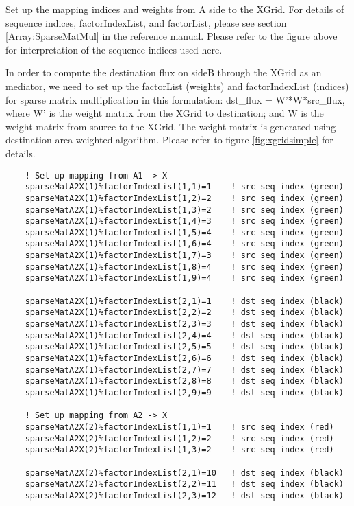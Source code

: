   
   Set up the mapping indices and weights from A side to the XGrid. For details of
   sequence indices, factorIndexList, and factorList, please see section
   \ref{Array:SparseMatMul} in the reference manual. Please refer to the figure above
   for interpretation of the sequence indices used here.
  
   In order to compute the destination flux on sideB through the XGrid as an mediator,
   we need to set up the factorList (weights) and factorIndexList (indices)
   for sparse matrix multiplication in this formulation:
   dst\_flux = W'*W*src\_flux, where W' is the weight matrix from the XGrid to
   destination; and W is the weight matrix from source to the XGrid. The weight matrix
   is generated using destination area weighted algorithm. Please refer to figure
   \ref {fig:xgridsimple} for details.
   

 \begin{verbatim}
    ! Set up mapping from A1 -> X
    sparseMatA2X(1)%factorIndexList(1,1)=1    ! src seq index (green)
    sparseMatA2X(1)%factorIndexList(1,2)=2    ! src seq index (green)
    sparseMatA2X(1)%factorIndexList(1,3)=2    ! src seq index (green)
    sparseMatA2X(1)%factorIndexList(1,4)=3    ! src seq index (green)
    sparseMatA2X(1)%factorIndexList(1,5)=4    ! src seq index (green)
    sparseMatA2X(1)%factorIndexList(1,6)=4    ! src seq index (green)
    sparseMatA2X(1)%factorIndexList(1,7)=3    ! src seq index (green)
    sparseMatA2X(1)%factorIndexList(1,8)=4    ! src seq index (green)
    sparseMatA2X(1)%factorIndexList(1,9)=4    ! src seq index (green)

    sparseMatA2X(1)%factorIndexList(2,1)=1    ! dst seq index (black)
    sparseMatA2X(1)%factorIndexList(2,2)=2    ! dst seq index (black)
    sparseMatA2X(1)%factorIndexList(2,3)=3    ! dst seq index (black)
    sparseMatA2X(1)%factorIndexList(2,4)=4    ! dst seq index (black)
    sparseMatA2X(1)%factorIndexList(2,5)=5    ! dst seq index (black)
    sparseMatA2X(1)%factorIndexList(2,6)=6    ! dst seq index (black)
    sparseMatA2X(1)%factorIndexList(2,7)=7    ! dst seq index (black)
    sparseMatA2X(1)%factorIndexList(2,8)=8    ! dst seq index (black)
    sparseMatA2X(1)%factorIndexList(2,9)=9    ! dst seq index (black)

    ! Set up mapping from A2 -> X
    sparseMatA2X(2)%factorIndexList(1,1)=1    ! src seq index (red)
    sparseMatA2X(2)%factorIndexList(1,2)=2    ! src seq index (red)
    sparseMatA2X(2)%factorIndexList(1,3)=2    ! src seq index (red)

    sparseMatA2X(2)%factorIndexList(2,1)=10   ! dst seq index (black)
    sparseMatA2X(2)%factorIndexList(2,2)=11   ! dst seq index (black)
    sparseMatA2X(2)%factorIndexList(2,3)=12   ! dst seq index (black)
 
\end{verbatim}
 
